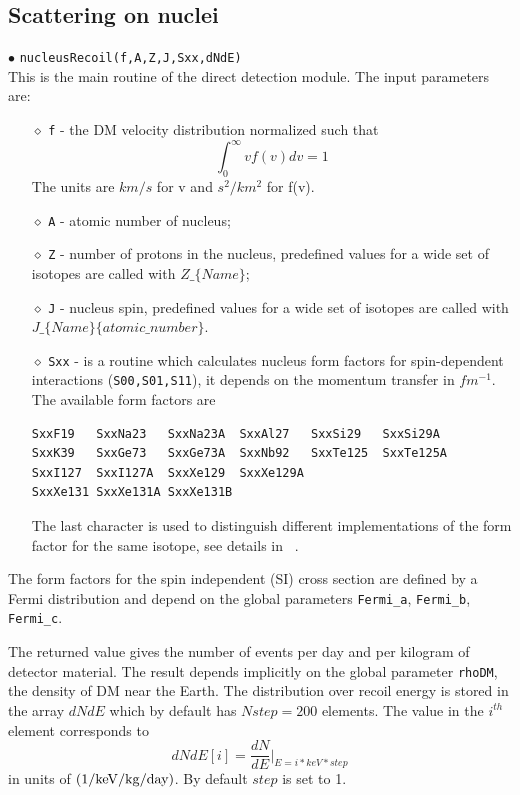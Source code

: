 \documentclass[12pt,a4paper]{article}
\begin{document}
\subsection{Scattering on nuclei}
\label{DDforNucleus}
$\bullet$ \verb|nucleusRecoil(f,A,Z,J,Sxx,dNdE)|\\
This is the main routine of the  direct detection module. The
input parameters are:
\begin{itemize}
\item[$\diamond$]
\verb|f| -  the DM velocity distribution   normalized such that 
$$ \int_0^{\infty} v f(v) dv =1$$ 
The units  are $km/s$ for v and $s^2/km^2$ for  f(v).
\item[$\diamond$]
\verb|A| - atomic number of nucleus;
\item[$\diamond$]
\verb|Z| - number of protons in the nucleus, predefined values for a wide set of isotopes 
are called with $Z\_\{Name\}$;
\item[$\diamond$]
\verb|J| - nucleus spin,  predefined values for a wide set of isotopes
are called with\\
 $J\_\{Name\}\{atomic\_number\}$.
\item[$\diamond$]
\verb|Sxx| - is a routine which calculates nucleus form factors for
spin-dependent interactions (\verb|S00,S01,S11|), it depends  on the momentum
transfer in $fm^{-1}$. The available form factors are
\begin{verbatim}
SxxF19   SxxNa23   SxxNa23A  SxxAl27   SxxSi29   SxxSi29A  
SxxK39   SxxGe73   SxxGe73A  SxxNb92   SxxTe125  SxxTe125A 
SxxI127  SxxI127A  SxxXe129  SxxXe129A 
SxxXe131 SxxXe131A SxxXe131B
\end{verbatim}
The last character 
is used to distinguish different implementations of
the form factor for the same isotope, see details in ~\cite{Belanger:2008sj}.
\end{itemize}
The form factors for the spin independent (SI) cross section are defined by a Fermi distribution
and depend on the global parameters \verb|Fermi_a|, \verb|Fermi_b|,
\verb|Fermi_c|. 

The returned value gives the number of events per day and per kilogram of 
detector material. The  result depends  implicitly on the  global  parameter \verb|rhoDM|, the
density of DM near the Earth.
The distribution over recoil energy is stored in the array 
$dNdE$ which by default has $Nstep=200$ elements.  
The value in the $i^{th}$ element corresponds to
$$
dNdE[i] = \frac{dN}{dE}|_{E=i*keV*step}
$$
in units of ${\rm (1/keV/kg/day)}$. By default $step$  is set to 1. 
\end{document}

